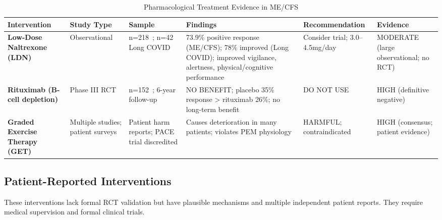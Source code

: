 \begin{table}[htbp]
\centering
\caption{Pharmacological Treatment Evidence in ME/CFS}
\label{tab:pharmacological-treatments}
\scriptsize
\begin{tabular}{p{2.5cm}p{1.8cm}p{2cm}p{4cm}p{2.2cm}p{1.5cm}}
\toprule
\textbf{Intervention} & \textbf{Study Type} & \textbf{Sample} & \textbf{Findings} & \textbf{Recommendation} & \textbf{Evidence} \\
\midrule
\textbf{Low-Dose Naltrexone (LDN)} & Observational & n=218~\cite{Polo2019}; n=42 Long COVID~\cite{Gottschalk2023} & 73.9\% positive response (ME/CFS); 78\% improved (Long COVID); improved vigilance, alertness, physical/cognitive performance & Consider trial; 3.0--4.5mg/day & MODERATE (large observational; no RCT) \\
\midrule
\textbf{Rituximab (B-cell depletion)} & Phase III RCT & n=152~\cite{Fluge2019}; 6-year follow-up~\cite{Rekeland2024} & NO BENEFIT; placebo 35\% response > rituximab 26\%; no long-term benefit & DO NOT USE & HIGH (definitive negative) \\
\midrule
\textbf{Graded Exercise Therapy (GET)} & Multiple studies; patient surveys & Patient harm reports; PACE trial discredited & Causes deterioration in many patients; violates PEM physiology & HARMFUL; contraindicated & HIGH (consensus; patient evidence) \\
\bottomrule
\end{tabular}
\end{table}

\subsection{Patient-Reported Interventions}
\label{subsec:patient-reported-interventions}

These interventions lack formal RCT validation but have plausible mechanisms and multiple independent patient reports. They require medical supervision and formal clinical trials.

